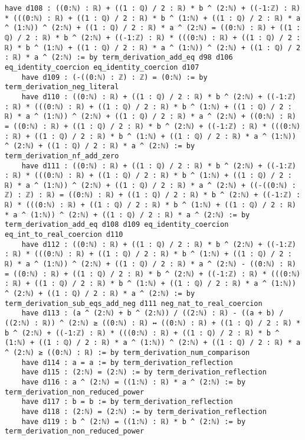 \documentclass{article}
\begin{document}
\begin{tcolorbox}[colback=white!10, width=\linewidth]
\begin{lstlisting}[language=Lean4]
    have d108 : ((0:ℕ) : ℝ) + ((1 : ℚ) / 2 : ℝ) * b ^ (2:ℕ) + ((-1:ℤ) : ℝ) * (((0:ℕ) : ℝ) + ((1 : ℚ) / 2 : ℝ) * b ^ (1:ℕ) + ((1 : ℚ) / 2 : ℝ) * a ^ (1:ℕ)) ^ (2:ℕ) + ((1 : ℚ) / 2 : ℝ) * a ^ (2:ℕ) = ((0:ℕ) : ℝ) + ((1 : ℚ) / 2 : ℝ) * b ^ (2:ℕ) + ((-1:ℤ) : ℝ) * (((0:ℕ) : ℝ) + ((1 : ℚ) / 2 : ℝ) * b ^ (1:ℕ) + ((1 : ℚ) / 2 : ℝ) * a ^ (1:ℕ)) ^ (2:ℕ) + ((1 : ℚ) / 2 : ℝ) * a ^ (2:ℕ) := by term_derivation_add_eq d98 d106 eq_identity_coercion eq_identity_coercion d107
    have d109 : (-((0:ℕ) : ℤ) : ℤ) = (0:ℕ) := by term_derivation_neg_literal
    have d110 : ((0:ℕ) : ℝ) + ((1 : ℚ) / 2 : ℝ) * b ^ (2:ℕ) + ((-1:ℤ) : ℝ) * (((0:ℕ) : ℝ) + ((1 : ℚ) / 2 : ℝ) * b ^ (1:ℕ) + ((1 : ℚ) / 2 : ℝ) * a ^ (1:ℕ)) ^ (2:ℕ) + ((1 : ℚ) / 2 : ℝ) * a ^ (2:ℕ) + ((0:ℕ) : ℝ) = ((0:ℕ) : ℝ) + ((1 : ℚ) / 2 : ℝ) * b ^ (2:ℕ) + ((-1:ℤ) : ℝ) * (((0:ℕ) : ℝ) + ((1 : ℚ) / 2 : ℝ) * b ^ (1:ℕ) + ((1 : ℚ) / 2 : ℝ) * a ^ (1:ℕ)) ^ (2:ℕ) + ((1 : ℚ) / 2 : ℝ) * a ^ (2:ℕ) := by term_derivation_nf_add_zero
    have d111 : ((0:ℕ) : ℝ) + ((1 : ℚ) / 2 : ℝ) * b ^ (2:ℕ) + ((-1:ℤ) : ℝ) * (((0:ℕ) : ℝ) + ((1 : ℚ) / 2 : ℝ) * b ^ (1:ℕ) + ((1 : ℚ) / 2 : ℝ) * a ^ (1:ℕ)) ^ (2:ℕ) + ((1 : ℚ) / 2 : ℝ) * a ^ (2:ℕ) + ((-((0:ℕ) : ℤ) : ℤ) : ℝ) = ((0:ℕ) : ℝ) + ((1 : ℚ) / 2 : ℝ) * b ^ (2:ℕ) + ((-1:ℤ) : ℝ) * (((0:ℕ) : ℝ) + ((1 : ℚ) / 2 : ℝ) * b ^ (1:ℕ) + ((1 : ℚ) / 2 : ℝ) * a ^ (1:ℕ)) ^ (2:ℕ) + ((1 : ℚ) / 2 : ℝ) * a ^ (2:ℕ) := by term_derivation_add_eq d108 d109 eq_identity_coercion eq_int_to_real_coercion d110
    have d112 : ((0:ℕ) : ℝ) + ((1 : ℚ) / 2 : ℝ) * b ^ (2:ℕ) + ((-1:ℤ) : ℝ) * (((0:ℕ) : ℝ) + ((1 : ℚ) / 2 : ℝ) * b ^ (1:ℕ) + ((1 : ℚ) / 2 : ℝ) * a ^ (1:ℕ)) ^ (2:ℕ) + ((1 : ℚ) / 2 : ℝ) * a ^ (2:ℕ) - ((0:ℕ) : ℝ) = ((0:ℕ) : ℝ) + ((1 : ℚ) / 2 : ℝ) * b ^ (2:ℕ) + ((-1:ℤ) : ℝ) * (((0:ℕ) : ℝ) + ((1 : ℚ) / 2 : ℝ) * b ^ (1:ℕ) + ((1 : ℚ) / 2 : ℝ) * a ^ (1:ℕ)) ^ (2:ℕ) + ((1 : ℚ) / 2 : ℝ) * a ^ (2:ℕ) := by term_derivation_sub_eqs_add_neg d111 neg_nat_to_real_coercion
    have d113 : (a ^ (2:ℕ) + b ^ (2:ℕ)) / ((2:ℕ) : ℝ) - ((a + b) / ((2:ℕ) : ℝ)) ^ (2:ℕ) ≥ ((0:ℕ) : ℝ) ↔ ((0:ℕ) : ℝ) + ((1 : ℚ) / 2 : ℝ) * b ^ (2:ℕ) + ((-1:ℤ) : ℝ) * (((0:ℕ) : ℝ) + ((1 : ℚ) / 2 : ℝ) * b ^ (1:ℕ) + ((1 : ℚ) / 2 : ℝ) * a ^ (1:ℕ)) ^ (2:ℕ) + ((1 : ℚ) / 2 : ℝ) * a ^ (2:ℕ) ≥ ((0:ℕ) : ℝ) := by term_derivation_num_comparison
    have d114 : a = a := by term_derivation_reflection
    have d115 : (2:ℕ) = (2:ℕ) := by term_derivation_reflection
    have d116 : a ^ (2:ℕ) = ((1:ℕ) : ℝ) * a ^ (2:ℕ) := by term_derivation_non_reduced_power
    have d117 : b = b := by term_derivation_reflection
    have d118 : (2:ℕ) = (2:ℕ) := by term_derivation_reflection
    have d119 : b ^ (2:ℕ) = ((1:ℕ) : ℝ) * b ^ (2:ℕ) := by term_derivation_non_reduced_power

\end{lstlisting}
\end{tcolorbox}
\end{document}
